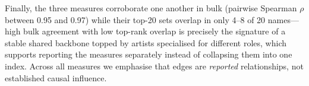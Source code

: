 Finally, the three measures corroborate one another in bulk (pairwise
Spearman $\rho$ between 0.95 and 0.97) while their top-20 sets overlap in
only 4--8 of 20 names---high bulk agreement with low top-rank overlap is
precisely the signature of a stable shared backbone topped by artists
specialised for different roles, which supports reporting the measures
separately instead of collapsing them into one index. Across all measures
we emphasise that edges are \emph{reported} relationships, not established
causal influence.

